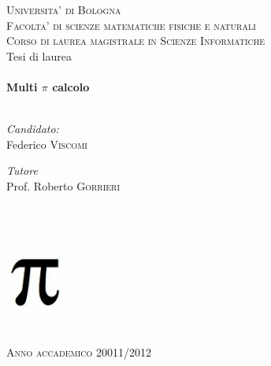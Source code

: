 
\begin{titlepage}

\begin{center}
\textsc{\LARGE Universita' di Bologna}\\[1.5cm]
\textsc{\Large Facolta' di scienze matematiche fisiche e naturali}\\[0.6cm]
\textsc{\Large Corso di laurea magistrale in Scienze Informatiche}\\[0.4cm]
{Tesi di laurea}\\[0.2cm]
 
\HRule \\[0.4cm]
{ \huge \bfseries Multi $\pi$ calcolo}\\[0.4cm]
\HRule \\[1.5cm]
\begin{minipage}{0.4\textwidth}
\begin{center} \large
\emph{Candidato:}\\
Federico \textsc{Viscomi}
{\large}
\end{center}
\end{minipage}

\vfill

\begin{minipage}{0.4\textwidth}
\begin{flushleft} \large
\emph{Tutore}\\
Prof. Roberto \textsc{Gorrieri}\\ 
\emph{\newline}\\
\dotfill \\
\emph{\newline\newline\newline} \\ 
\end{flushleft}
\end{minipage}


\includegraphics[width=0.15\textwidth]{./pi}
 
\HRule \\[1.5cm]
\textsc{\Large Anno accademico 20011/2012}\\[0.5cm]
\end{center}

\end{titlepage}
